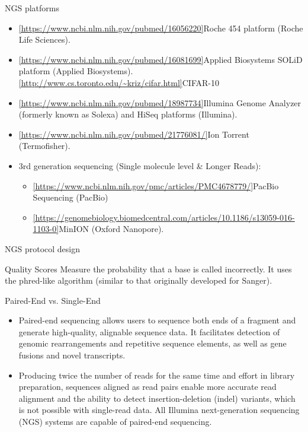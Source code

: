 \documentclass{if-beamer}
\begin{document}
\begin{frame}{NGS platforms}
\begin{large}
\begin{itemize}
    \item \cref{https://www.ncbi.nlm.nih.gov/pubmed/16056220}{Roche 454 platform} (Roche Life Sciences).
    \item \cref{https://www.ncbi.nlm.nih.gov/pubmed/16081699}{Applied Biosystems SOLiD platform} (Applied Biosystems).
    \cref{http://www.cs.toronto.edu/~kriz/cifar.html}{CIFAR-10}
    \item \cref{https://www.ncbi.nlm.nih.gov/pubmed/18987734}{Illumina Genome Analyzer} (formerly known as Solexa) and HiSeq platforms (Illumina). 
    \item \cref{https://www.ncbi.nlm.nih.gov/pubmed/21776081/}{Ion Torrent} (Termofisher).
    \item 3rd generation sequencing (Single molecule level \& Longer Reads): 
    \begin{itemize}
        \item \cref{https://www.ncbi.nlm.nih.gov/pmc/articles/PMC4678779/}{PacBio Sequencing} (PacBio)
        \item \cref{https://genomebiology.biomedcentral.com/articles/10.1186/s13059-016-1103-0}{MinION} (Oxford Nanopore).
    \end{itemize}
\end{itemize}
\end{large}
\end{frame}
\begin{frame}{NGS protocol design}
\begin{exampleblock}{Quality Scores}
Measure the probability that a base is called incorrectly. It uses the phred-like algorithm (similar to that originally developed for Sanger).
\end{exampleblock}
\begin{exampleblock}{Paired-End vs. Single-End}
\begin{itemize}
  \item Paired-end sequencing allows users to sequence both ends of a fragment and generate high-quality, alignable sequence data. It facilitates detection of genomic rearrangements and repetitive sequence elements, as well as gene fusions and novel transcripts.
  \item Producing twice the number of reads for the same time and effort in library preparation, sequences aligned as read pairs enable more accurate read alignment and the ability to detect insertion-deletion (indel) variants, which is not possible with single-read data. All Illumina next-generation sequencing (NGS) systems are capable of paired-end sequencing.
\end{itemize}
\end{exampleblock}
\end{frame}
\end{document}

